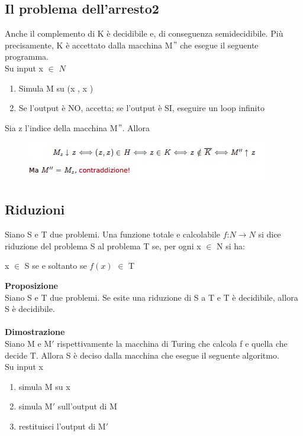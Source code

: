 \subsection{Il problema dell'arresto2}
Anche il complemento di K è decidibile e, di conseguenza semidecidibile. Più precisamente, K è accettato dalla macchina M$"$ che esegue il seguente programma.\\
Su input x $\in$ $N$
\begin{center}
    \begin{enumerate}
        \item Simula M su (x , x )
        
        \item Se l’output è NO, accetta; se l’output è SI, eseguire un loop infinito
    \end{enumerate}
\end{center}
Sia z l’indice della macchina M$"$. Allora\\
\begin{figure}[htp]
    \centering
    \includegraphics[scale=1]{tesi_stile/img/contraddizione.png}
\end{figure}
\subsection{Riduzioni}
Siano S e T due problemi. Una funzione totale e calcolabile $f$:$N$$\rightarrow$$N$ si dice riduzione del problema S al problema T se, per ogni x $\in$ N si ha:
\begin{center}
    x $\in$ S se e soltanto se $f(x)$ $\in$ T
\end{center}
\textbf{Proposizione}\\
Siano S e T due problemi. Se esite una riduzione di S a T e T è decidibile, allora S è decidibile.\\\\
\textbf{Dimostrazione}\\
Siano M e M$'$ rispettivamente la macchina di Turing che calcola f e quella che decide T. Allora S è deciso dalla macchina che esegue il seguente algoritmo.\\
Su input x
\begin{enumerate}
    \item simula M su x
    
    \item simula M$'$ sull’output di M
    
    \item restituisci l’output di M$'$
\end{enumerate}
